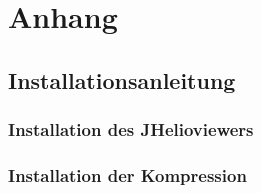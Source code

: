 \section{Anhang}
\subsection*{Installationsanleitung}
\subsubsection*{Installation des JHelioviewers}


\subsubsection*{Installation der Kompression}
\pagebreak

